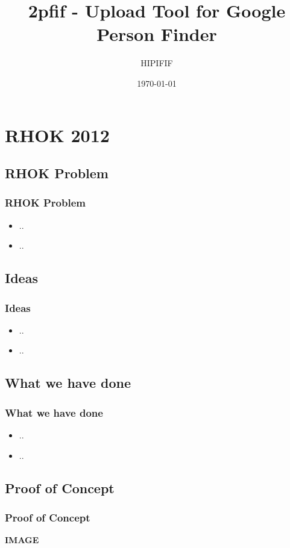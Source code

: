 \documentclass{beamer}
\begin{document}
\title{2pfif - Upload Tool for Google Person Finder}
\author{HIPIFIF}
\date{\today} 

\begin{frame}
\titlepage
\end{frame}



\section{RHOK 2012}
\subsection{RHOK Problem}
\begin{frame}\frametitle{RHOK Problem}
\begin{itemize}
	\item ..
	\item ..
\end{itemize}
\end{frame}

\subsection{Ideas}
\begin{frame}\frametitle{Ideas}
\begin{itemize}
	\item ..
	\item ..
\end{itemize}
\end{frame}

\subsection{What we have done}
\begin{frame}\frametitle{What we have done}
\begin{itemize}
	\item ..
	\item ..
\end{itemize}
\end{frame}

\subsection{Proof of Concept}
\begin{frame}\frametitle{Proof of Concept}
\textbf{IMAGE}
\end{frame}
\end{document}
